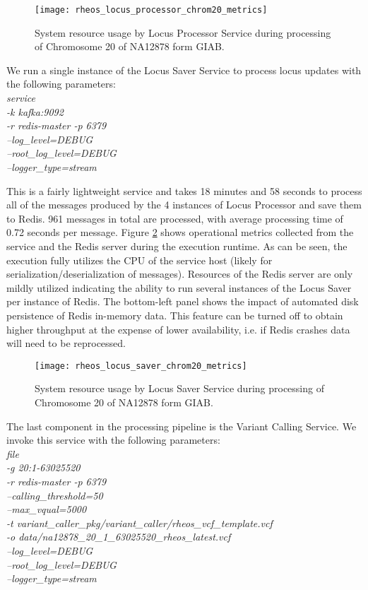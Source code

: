 \begin{figure}[h!]
    \texttt{[image: rheos\_locus\_processor\_chrom20\_metrics]}
    \centering
    \caption {System resource usage by Locus Processor Service during processing of Chromosome 20 of NA12878 form GIAB.}
    \label{fig:rheos_locus_processor_chrom20_metrics}
\end{figure}


We run a single instance of the Locus Saver Service to process locus updates with the following parameters:
\\
\emph{service\\
-k kafka:9092\\
-r redis-master -p 6379\\
--log\_level=DEBUG\\
--root\_log\_level=DEBUG\\
--logger\_type=stream}

This is a fairly lightweight service and takes 18 minutes and 58 seconds to process all of the messages produced by the  4 instances of Locus Processor and save them to Redis. 961 messages in total are processed, with average processing time of 0.72 seconds per message. Figure \ref{fig:rheos_locus_saver_chrom20_metrics} shows operational metrics collected from the service and the Redis server during the execution runtime. As can be seen, the execution fully utilizes the CPU of the service host (likely for serialization/deserialization of messages). Resources of the Redis server are only mildly utilized indicating the ability to run several instances of the Locus Saver per instance of Redis. The bottom-left panel shows the impact of automated disk persistence of Redis in-memory data. This feature can be turned off to obtain higher throughput at the expense of lower availability, i.e. if Redis crashes data will need to be reprocessed.   

\begin{figure}[h!]
    \texttt{[image: rheos\_locus\_saver\_chrom20\_metrics]}
    \centering
    \caption {System resource usage by Locus Saver Service during processing of Chromosome 20 of NA12878 form GIAB.}
    \label{fig:rheos_locus_saver_chrom20_metrics}
\end{figure}

The last component in the processing pipeline is the Variant Calling Service. We invoke this service with the following parameters:
\\
\emph{file\\
-g 20:1-63025520\\
-r redis-master -p 6379\\
--calling\_threshold=50\\
--max\_vqual=5000\\
-t variant\_caller\_pkg/variant\_caller/rheos\_vcf\_template.vcf\\
-o data/na12878\_20\_1\_63025520\_rheos\_latest.vcf\\
--log\_level=DEBUG\\
--root\_log\_level=DEBUG\\
--logger\_type=stream}


